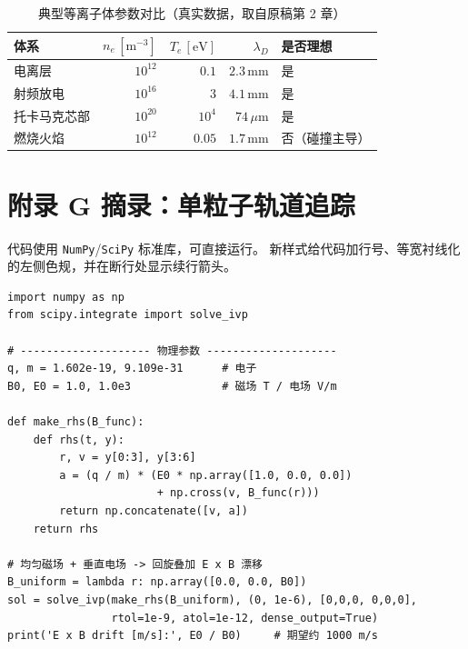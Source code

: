 \documentclass[11pt,a4paper,openany,oneside]{book}
\begin{document}
\begin{table}[htbp]
\centering
\caption{典型等离子体参数对比（真实数据，取自原稿第 2 章）}
\small
\begin{tabular}{@{}lrrrl@{}}
\toprule
\textbf{体系} & $n_e\,[\mathrm{m^{-3}}]$ & $T_e\,[\mathrm{eV}]$ &
$\lambda_D$ & \textbf{是否理想} \\
\midrule
电离层 & $10^{12}$ & $0.1$ & $2.3\,\mathrm{mm}$ & 是 \\
射频放电 & $10^{16}$ & $3$ & $4.1\,\mathrm{mm}$ & 是 \\
托卡马克芯部 & $10^{20}$ & $10^{4}$ & $74\,\mu\mathrm{m}$ & 是 \\
燃烧火焰 & $10^{12}$ & $0.05$ & $1.7\,\mathrm{mm}$ & 否（碰撞主导） \\
\bottomrule
\end{tabular}
\end{table}

\clearpage

\section{附录 G 摘录：单粒子轨道追踪}

\noindent 代码使用 \texttt{NumPy}/\texttt{SciPy} 标准库，可直接运行。
新样式给代码加行号、等宽衬线化的左侧色规，并在断行处显示续行箭头。

\begin{lstlisting}[style=py,
  caption={洛伦兹力方程的单粒子轨道积分（附录 G.1 摘录）},
  label={lst:preview-orbit}]
import numpy as np
from scipy.integrate import solve_ivp

# -------------------- 物理参数 --------------------
q, m = 1.602e-19, 9.109e-31      # 电子
B0, E0 = 1.0, 1.0e3              # 磁场 T / 电场 V/m

def make_rhs(B_func):
    def rhs(t, y):
        r, v = y[0:3], y[3:6]
        a = (q / m) * (E0 * np.array([1.0, 0.0, 0.0])
                       + np.cross(v, B_func(r)))
        return np.concatenate([v, a])
    return rhs

# 均匀磁场 + 垂直电场 -> 回旋叠加 E x B 漂移
B_uniform = lambda r: np.array([0.0, 0.0, B0])
sol = solve_ivp(make_rhs(B_uniform), (0, 1e-6), [0,0,0, 0,0,0],
                rtol=1e-9, atol=1e-12, dense_output=True)
print('E x B drift [m/s]:', E0 / B0)     # 期望约 1000 m/s
\end{lstlisting}
\end{document}
